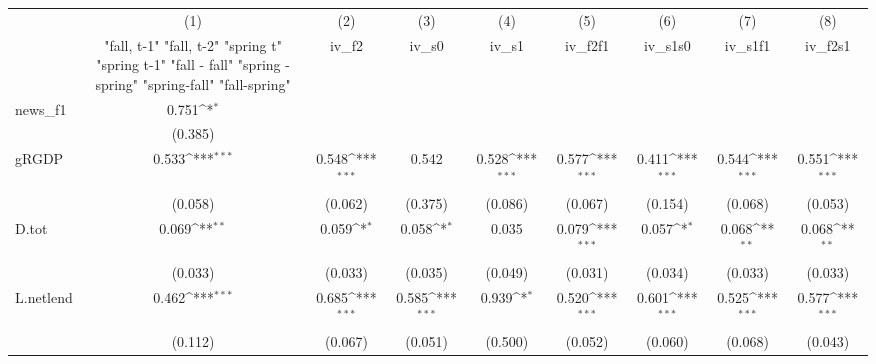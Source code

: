 {
\def\sym#1{\ifmmode^{#1}\else\(^{#1}\)\fi}
\begin{tabular}{l*{8}{c}}
\toprule
            &\multicolumn{1}{c}{(1)}&\multicolumn{1}{c}{(2)}&\multicolumn{1}{c}{(3)}&\multicolumn{1}{c}{(4)}&\multicolumn{1}{c}{(5)}&\multicolumn{1}{c}{(6)}&\multicolumn{1}{c}{(7)}&\multicolumn{1}{c}{(8)}\\
            &\multicolumn{1}{c}{  "fall, t-1" "fall, t-2" "spring t" "spring t-1"  "fall - fall" "spring - spring" "spring-fall" "fall-spring" }&\multicolumn{1}{c}{iv\_f2}&\multicolumn{1}{c}{iv\_s0}&\multicolumn{1}{c}{iv\_s1}&\multicolumn{1}{c}{iv\_f2f1}&\multicolumn{1}{c}{iv\_s1s0}&\multicolumn{1}{c}{iv\_s1f1}&\multicolumn{1}{c}{iv\_f2s1}\\
\midrule
news\_f1     &       0.751\sym{*}  &                     &                     &                     &                     &                     &                     &                     \\
            &     (0.385)         &                     &                     &                     &                     &                     &                     &                     \\
\addlinespace
gRGDP       &       0.533\sym{***}&       0.548\sym{***}&       0.542         &       0.528\sym{***}&       0.577\sym{***}&       0.411\sym{***}&       0.544\sym{***}&       0.551\sym{***}\\
            &     (0.058)         &     (0.062)         &     (0.375)         &     (0.086)         &     (0.067)         &     (0.154)         &     (0.068)         &     (0.053)         \\
\addlinespace
D.tot       &       0.069\sym{**} &       0.059\sym{*}  &       0.058\sym{*}  &       0.035         &       0.079\sym{***}&       0.057\sym{*}  &       0.068\sym{**} &       0.068\sym{**} \\
            &     (0.033)         &     (0.033)         &     (0.035)         &     (0.049)         &     (0.031)         &     (0.034)         &     (0.033)         &     (0.033)         \\
\addlinespace
L.netlend   &       0.462\sym{***}&       0.685\sym{***}&       0.585\sym{***}&       0.939\sym{*}  &       0.520\sym{***}&       0.601\sym{***}&       0.525\sym{***}&       0.577\sym{***}\\
            &     (0.112)         &     (0.067)         &     (0.051)         &     (0.500)         &     (0.052)         &     (0.060)         &     (0.068)         &     (0.043)         \\

\end{tabular}}

